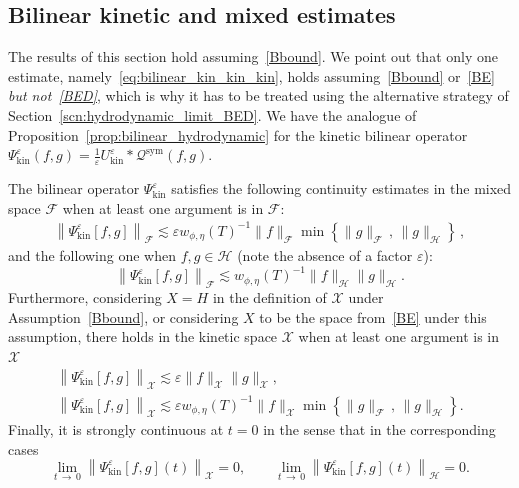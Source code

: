 \documentclass[10pt]{amsart}
\theoremstyle{definition}\newtheorem{defi}[theo]{Definition}\newtheorem{rema}[theo]{Remark}\newtheorem{exam}[theo]{Example}\newtheorem{exem}[theo]{Example}\newtheorem{nota}[theo]{Notation}
\newcommand{\kin}{\mathrm{kin}}
\newcommand{\sym}{\mathrm{sym}}
\newcommand{\XX}{\mathcal{X}}
\newcommand{\HH}{\mathcal{H}}
\newcommand{\QQ}{\mathcal{Q}}
\newcommand{\FFF}{\mathscr{F}}
\newcommand{\HHH}{\mathscr{H}}
\newcommand{\GGG}{\mathscr{X}}
\newcommand{\Ss}{H}
\newcommand{\SSs}{\HH}
\newcommand{\SSSs}{\HHH}
\newcommand{\Sl}{X}
\newcommand{\SSl}{\XX}
\newcommand{\SSSl}{\GGG}
\newcommand{\SSSm}{\FFF}
\newcommand*\eps{{\varepsilon}}
\begin{document}
\subsection{Bilinear kinetic and mixed estimates}

The results of this section hold assuming~\eqref{Bbound}. We point out that only one estimate, namely~\eqref{eq:bilinear_kin_kin_kin}, holds assuming~\eqref{Bbound} or~\eqref{BE} \emph{but not~\ref{BED}}, which is why it has to be treated using the alternative strategy of Section~\ref{scn:hydrodynamic_limit_BED}. We have the analogue of Proposition~\ref{prop:bilinear_hydrodynamic} for the kinetic bilinear operator $\Psi^\eps_\kin(f, g) = \frac{1}{\eps} U^\eps_\kin \ast \QQ^\sym(f, g)$.

\begin{prop}\label{prop:bilinear_kinetic}
The bilinear operator $\Psi^\eps_\kin$ satisfies the following continuity estimates in the mixed space $\SSSm$ when at least one argument is in $\SSSm$:
\begin{gather}\label{eq:bilinear_mix_mix_mix}
\left\| \Psi^\eps_\kin [f, g] \right\|_\SSSm \lesssim \eps w_{\phi, \eta}(T)^{-1} \| f \|_\SSSm \min\left\{\| g \|_\SSSm\,,\,\| g \|_\SSSs\right\}\,,
\end{gather}
and the following one when $f, g \in \SSSs$ (note the absence of a factor $\eps$):
\begin{equation}\label{eq:bilinear_mix_hyd_hyd}
\left\| \Psi^\eps_\kin [f, g]\right\|_\SSSm \lesssim w_{\phi, \eta}(T)^{-1} \| f \|_\SSSs \| g \|_\SSSs.
\end{equation}
Furthermore, considering $\Sl = \Ss$ in the definition of $\SSSl$ under Assumption~\eqref{Bbound}, or considering $\Sl$ to be the space from~\eqref{BE} under this assumption, there holds in the kinetic space $\SSSl$ when at least one argument is in $\SSSl$
\begin{subequations}\label{eq:bilinear_kin}
\begin{gather}
\left\| \Psi^\eps_\kin [f, g] \right\|_\SSSl \lesssim \eps \| f \|_\SSSl \| g \|_\SSSl,\label{eq:bilinear_kin_kin_kin}\\
\left\| \Psi^\eps_\kin [f, g] \right\|_\SSSl \lesssim \eps w_{\phi, \eta}(T)^{-1} \| f \|_\SSSl \min\left\{ \| g \|_\SSSm\,,\,\| g \|_\SSSs\right\}.\label{eq:bilinear_kin_kin_mix}
\end{gather}
\end{subequations}
Finally, it is strongly continuous at $t = 0$ in the sense that in the corresponding cases
\[
\lim_{t\,\to\,0}\left\| \Psi^\eps_\kin [f, g](t)\right\|_\SSl= 0, \qquad \lim_{t\,\to\,0}\left\| \Psi^\eps_\kin [f, g](t) \right\|_\SSs = 0.
\]
\end{prop}
\end{document}
